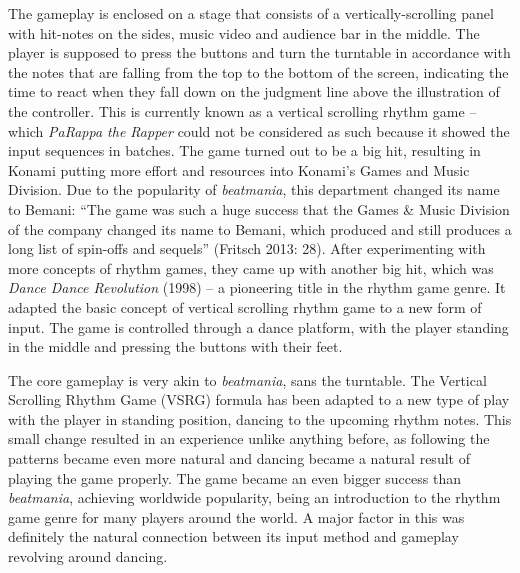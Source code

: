 The gameplay is enclosed on a stage that consists of a vertically-scrolling panel with hit-notes on the sides, music video and audience bar in the middle. The player is supposed to press the buttons and turn the turntable in accordance with the notes that are falling from the top to the bottom of the screen, indicating the time to react when they fall down on the judgment line above the illustration of the controller. This is currently known as a vertical scrolling rhythm game -- which \textit{PaRappa the Rapper} could not be considered as such because it showed the input sequences in batches. The game turned out to be a big hit, resulting in Konami putting more effort and resources into Konami’s Games and Music Division. Due to the popularity of \textit{beatmania}, this department changed its name to Bemani: “The game was such a huge success that the Games \& Music Division
of the company changed its name to Bemani, which produced and still produces a
long list of spin-offs and sequels” (Fritsch 2013: 28). \cite{MusicMedien} After experimenting with more concepts of rhythm games, they came up with another big hit, which was \textit{Dance Dance Revolution} (1998) -- a pioneering title in the rhythm game genre. It adapted the basic concept of vertical scrolling rhythm game to a new form of input. The game is controlled through a dance platform, with the player standing in the middle and pressing the buttons with their feet.

The core gameplay is very akin to \textit{beatmania}, sans the turntable. The Vertical Scrolling Rhythm Game (VSRG) formula has been adapted to a new type of play with the player in standing position, dancing to the upcoming rhythm notes. This small change resulted in an experience unlike anything before, as following the patterns became even more natural and dancing became a natural result of playing the game properly. The game became an even bigger success than \textit{beatmania}, achieving worldwide popularity, being an introduction to the rhythm game genre for many players around the world. A major factor in this was definitely the natural connection between its input method and gameplay revolving around dancing.

